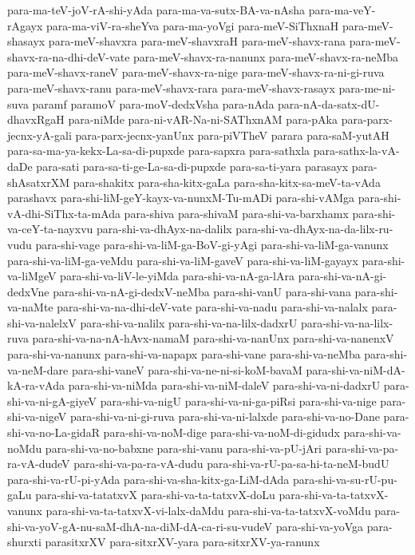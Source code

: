 {para-ma-teV-joV-rA-shi-yAda
para-ma-va-sutx-BA-va-nAsha
para-ma-veY-rAgayx
para-ma-viV-ra-sheYva
para-ma-yoVgi
para-meV-SiThxnaH
para-meV-shasayx
para-meV-shavxra
para-meV-shavxraH
para-meV-shavx-rana
para-meV-shavx-ra-na-dhi-deV-vate
para-meV-shavx-ra-nanunx
para-meV-shavx-ra-neMba
para-meV-shavx-raneV
para-meV-shavx-ra-nige
para-meV-shavx-ra-ni-gi-ruva
para-meV-shavx-ranu
para-meV-shavx-rara
para-meV-shavx-rasayx
para-me-ni-suva
paramf
paramoV
para-moV-dedxVsha
para-nAda
para-nA-da-satx-dU-dhavxRgaH
para-niMde
para-ni-vAR-Na-ni-SAThxnAM
para-pAka
para-parx-jecnx-yA-gali
para-parx-jecnx-yanUnx
para-piVTheV
parara
para-saM-yutAH
para-sa-ma-ya-kekx-La-sa-di-pupxde
para-sapxra
para-sathxla
para-sathx-la-vA-daDe
para-sati
para-sa-ti-ge-La-sa-di-pupxde
para-sa-ti-yara
parasayx
para-shAsatxrXM
para-shakitx
para-sha-kitx-gaLa
para-sha-kitx-sa-meV-ta-vAda
parashavx
para-shi-liM-geY-kayx-va-nunxM-Tu-mADi
para-shi-vAMga
para-shi-vA-dhi-SiThx-ta-mAda
para-shiva
para-shivaM
para-shi-va-barxhamx
para-shi-va-ceY-ta-nayxvu
para-shi-va-dhAyx-na-dalilx
para-shi-va-dhAyx-na-da-lilx-ru-vudu
para-shi-vage
para-shi-va-liM-ga-BoV-gi-yAgi
para-shi-va-liM-ga-vanunx
para-shi-va-liM-ga-veMdu
para-shi-va-liM-gaveV
para-shi-va-liM-gayayx
para-shi-va-liMgeV
para-shi-va-liV-le-yiMda
para-shi-va-nA-ga-lAra
para-shi-va-nA-gi-dedxVne
para-shi-va-nA-gi-dedxV-neMba
para-shi-vanU
para-shi-vana
para-shi-va-naMte
para-shi-va-na-dhi-deV-vate
para-shi-va-nadu
para-shi-va-nalalx
para-shi-va-nalelxV
para-shi-va-nalilx
para-shi-va-na-lilx-dadxrU
para-shi-va-na-lilx-ruva
para-shi-va-na-nA-hAvx-namaM
para-shi-va-nanUnx
para-shi-va-nanenxV
para-shi-va-nanunx
para-shi-va-napapx
para-shi-vane
para-shi-va-neMba
para-shi-va-neM-dare
para-shi-vaneV
para-shi-va-ne-ni-si-koM-bavaM
para-shi-va-niM-dA-kA-ra-vAda
para-shi-va-niMda
para-shi-va-niM-daleV
para-shi-va-ni-dadxrU
para-shi-va-ni-gA-giyeV
para-shi-va-nigU
para-shi-va-ni-ga-piRsi
para-shi-va-nige
para-shi-va-nigeV
para-shi-va-ni-gi-ruva
para-shi-va-ni-lalxde
para-shi-va-no-Dane
para-shi-va-no-La-gidaR
para-shi-va-noM-dige
para-shi-va-noM-di-gidudx
para-shi-va-noMdu
para-shi-va-no-babxne
para-shi-vanu
para-shi-va-pU-jAri
para-shi-va-pa-ra-vA-dudeV
para-shi-va-pa-ra-vA-dudu
para-shi-va-rU-pa-sa-hi-ta-neM-budU
para-shi-va-rU-pi-yAda
para-shi-va-sha-kitx-ga-LiM-dAda
para-shi-va-su-rU-pu-gaLu
para-shi-va-tatatxvX
para-shi-va-ta-tatxvX-doLu
para-shi-va-ta-tatxvX-vanunx
para-shi-va-ta-tatxvX-vi-lalx-daMdu
para-shi-va-ta-tatxvX-voMdu
para-shi-va-yoV-gA-nu-saM-dhA-na-diM-dA-ca-ri-su-vudeV
para-shi-va-yoVga
para-shurxti
parasitxrXV
para-sitxrXV-yara
para-sitxrXV-ya-ranunx
}
